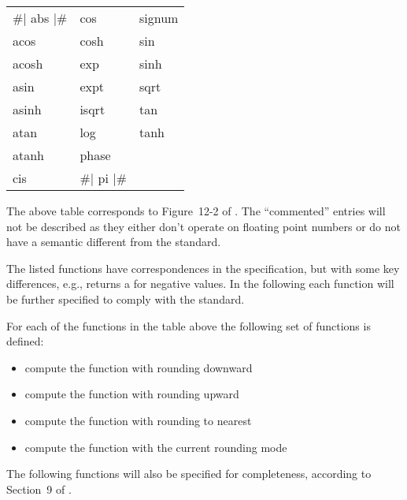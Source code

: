 \documentclass[../../Operations.tex]{subfiles}
\begin{document}
\label{sect:transc-ops}

\begin{tt}
  \begin{tabular}{lll}
    \#| abs |\# & cos & signum\\
    acos &  cosh &  sin\\
    acosh & exp  &  sinh\\
    asin &  expt &  sqrt\\
    asinh & isqrt &  tan\\
    atan &  log &   tanh\\
    atanh & phase & \\
    cis & \#| pi |\# & \\
  \end{tabular}
\end{tt}

\vspace*{3mm}

\noindent
The above table corresponds to Figure~12-2 of \cite{1996:ANSIHyperSpec}.
The ``commented'' entries will not be described as they either don't
operate on floating point numbers or do not have a semantic different
from the \CL{} standard.

\noindent
The listed \CL{} functions have correspondences in the \cite{2008:IEEE-754}
specification, but with some key differences, e.g.,  returns
a  for negative values.  In the following each
function will be further specified to comply with the \cite{2008:IEEE-754}
standard.


\noindent
For each of the functions in the table above the following set of functions is
defined:
\begin{itemize}
\item {} compute the function with rounding downward
\item {} compute the function with rounding upward
\item {} compute the function with rounding to nearest
\item {} compute the function with the current rounding mode
\end{itemize}
\vspace*{3mm}

The following functions will also be specified for completeness,
according to Section~9 of \cite{2008:IEEE-754}.









\end{document}
